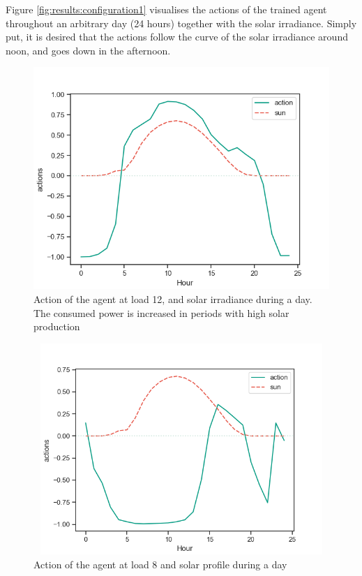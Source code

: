 \documentclass[class=book, crop=false, 11pt]{standalone}
\begin{document}
Figure \ref{fig:results:configuration1} visualises the actions of the trained agent throughout an arbitrary day (24 hours) together with the solar irradiance. Simply put, it is desired that the actions follow the curve of the solar irradiance around noon, and goes down in the afternoon. 

\begin{figure}[h]
    \center
\includegraphics[scale=0.7]{figures/configuration1_follows_sun.png}
    \caption {Action of the agent at load 12, and solar irradiance during a day. The consumed power is increased in periods with high solar production}
    \label{fig:results:configuration1_follows_sun}
\end{figure}

\begin{figure}[h]
    \center
\includegraphics[height=8cm, width=12cm]{figures/configuration1_negative_actions.png}
    \caption {Action of the agent at load 8 and solar profile during a day}
    \label{fig:results:configuration1_negative_actions}
\end{figure}
\end{document}
